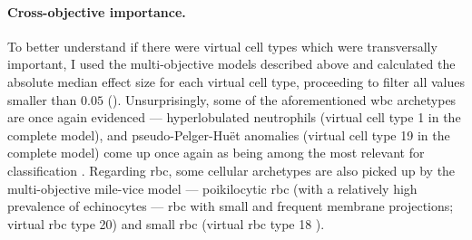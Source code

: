 \begin{figure}[!ht]
    \label{fig:rbc-anaemia-classification-examples}
\end{figure}

\begin{figure}[!ht]
    \label{fig:wbc-anaemia-classification-examples}
\end{figure}

\paragraph{Cross-objective importance.} To better understand if there were virtual cell types which were transversally important, I used the multi-objective models described above and calculated the absolute median effect size for each virtual cell type, proceeding to filter all values smaller than $0.05$ (). Unsurprisingly, some of the aforementioned \ac{wbc} archetypes are once again evidenced --- hyperlobulated neutrophils (virtual cell type 1 in the complete model), and pseudo-Pelger-Huët anomalies (virtual cell type 19 in the complete model) come up once again as being among the most relevant for classification . Regarding \ac{rbc}, some cellular archetypes are also picked up by the multi-objective \ac{mile-vice} model --- poikilocytic \ac{rbc} (with a relatively high prevalence of echinocytes --- \ac{rbc} with small and frequent membrane projections; virtual \ac{rbc} type 20) and small \ac{rbc} (virtual \ac{rbc} type 18 ).

\begin{figure}[!ht]
    \label{fig:multi-objective-importance}
\end{figure}

\begin{figure}[!ht]
    \label{fig:multi-objective-cell-examples}
\end{figure}

